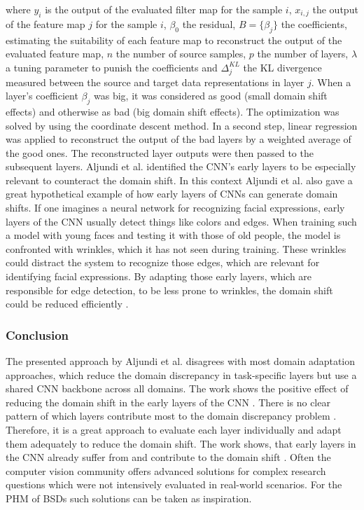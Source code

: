 where $y_{i}$ is the output of the evaluated filter map for the sample $i$, $x_{i,j}$ the output of the feature map $j$ for the sample $i$, $\beta_{0}$ the residual, $B = \{\beta_{j}\}$ the coefficients, estimating the suitability of each feature map to reconstruct the output of the evaluated feature map, $n$ the number of source samples, $p$ the number of layers, $\lambda$ a tuning parameter to punish the coefficients and $\Delta_{j}^{KL}$ the KL divergence measured between the source and target data representations in layer $j$. When a layer's coefficient  $\beta_{j}$ was big, it was considered as good (small domain shift effects) and otherwise as bad (big domain shift effects). The optimization was solved by using the coordinate descent method. In a second step, linear regression was applied to reconstruct the output of the bad layers by a weighted average of the good ones. The reconstructed layer outputs were then passed to the subsequent layers. Aljundi et al. \cite{Aljundi2016} identified the CNN's early layers to be especially relevant to counteract the domain shift. In this context Aljundi et al. \cite{Aljundi2016} also gave a great hypothetical example of how early layers of CNNs can generate domain shifts. If one imagines a neural network for recognizing facial expressions, early layers of the CNN usually detect things like colors and edges. When training such a model with young faces and testing it with those of old people, the model is confronted with wrinkles, which it has not seen during training. These wrinkles could distract the system to recognize those edges, which are relevant for identifying facial expressions. By adapting those early layers, which are responsible for edge detection, to be less prone to wrinkles, the domain shift could be reduced efficiently \cite{Aljundi2016}. 

\subsubsection{Conclusion}
The presented approach by Aljundi et al. \cite{Aljundi2016} disagrees with most domain adaptation approaches, which reduce the domain discrepancy in task-specific layers but use a shared CNN backbone across all domains. The work shows the positive effect of reducing the domain shift in the early layers of the CNN \cite{Aljundi2016}. There is no clear pattern of which layers contribute most to the domain discrepancy problem \cite{Aljundi2016}. Therefore, it is a great approach to evaluate each layer individually and adapt them adequately to reduce the domain shift. The work shows, that early layers in the CNN already suffer from and contribute to the domain shift \cite{Aljundi2016}. Often the computer vision community offers advanced solutions for complex research questions which were not intensively evaluated in real-world scenarios. For the PHM of BSDs such solutions can be taken as inspiration.


